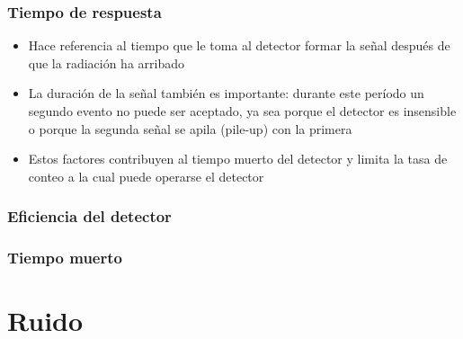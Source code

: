 \documentclass{beamer}
\begin{document}
\begin{frame}
\frametitle{Tiempo de respuesta}
\begin{exampleblock}{}
\begin{itemize}
\item Hace referencia al tiempo que le toma al detector formar la señal después de que la radiación ha arribado
\end{itemize}
\end{exampleblock}
\begin{alertblock}{}
\begin{itemize}
\item La duración de la señal también es importante: \alert{durante 
este período un segundo evento no puede ser aceptado, ya 
sea porque el detector es insensible o porque la segunda 
señal se apila (pile-up) con la primera}
\item Estos factores contribuyen al \alert{tiempo muerto} del detector 
y limita la tasa de conteo a la cual puede operarse el detector
\end{itemize}
\end{alertblock}
\end{frame} 

\subsubsection{Eficiencia del detector}

\subsubsection{Tiempo muerto}

\section{Ruido}
\end{document}
